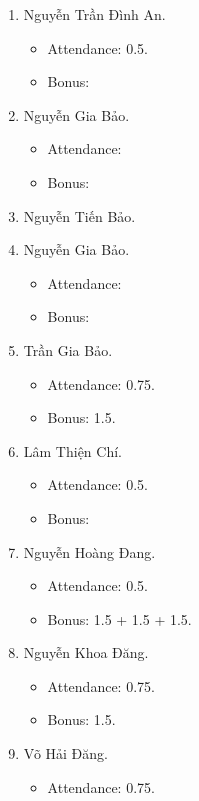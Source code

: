 \documentclass{article}
\begin{document}
\begin{enumerate}
    \item {\sc Nguyễn Trần Đình An.}
    \begin{itemize}
        \item Attendance: 0.5.
        \item Bonus:
    \end{itemize}
    \item {\sc Nguyễn Gia Bảo.}
    \begin{itemize}
        \item Attendance:
        \item Bonus:
    \end{itemize}
    \item {\sc Nguyễn Tiến Bảo.}
    \item {\sc Nguyễn Gia Bảo.}
    \begin{itemize}
        \item Attendance:
        \item Bonus:
    \end{itemize}
    \item {\sc Trần Gia Bảo.}
    \begin{itemize}
        \item Attendance: 0.75.
        \item Bonus: 1.5.
    \end{itemize}
    \item {\sc Lâm Thiện Chí.}
    \begin{itemize}
        \item Attendance: 0.5.
        \item Bonus:
    \end{itemize}
    \item {\sc Nguyễn Hoàng Đang.}
    \begin{itemize}
        \item Attendance: 0.5.
        \item Bonus: 1.5 + 1.5 + 1.5.
    \end{itemize}
    \item {\sc Nguyễn Khoa Đăng.}
    \begin{itemize}
        \item Attendance: 0.75.
        \item Bonus: 1.5.
    \end{itemize}
    \item {\sc Võ Hải Đăng.}
    \begin{itemize}
        \item Attendance: 0.75.

\end{itemize}
\end{enumerate}
\end{document}
